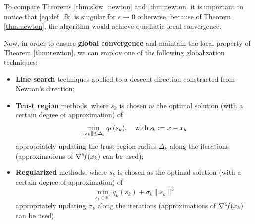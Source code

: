 \documentclass[10pt,a4paper]{article}
\begin{document}
\begin{remark}
	To compare Theorems \ref{thm:slow_newton} and \ref{thm:newton} it is important to notice that \eqref{eq:def_fk} is singular for $\epsilon\to 0$ otherwise, because of Theorem \ref{thm:newton}, the algorithm would achieve quadratic local convergence.
\end{remark}
\noindent Now, in order to ensure \textbf{global convergence} and maintain the local property of Theorem \ref{thm:newton}, we can employ one of the following globalization techniques:
\begin{itemize}
	\item \textbf{Line search} techniques applied to a descent direction constructed from Newton's direction;
	\item \textbf{Trust region} methods, where $s_k$ is chosen as the optimal solution (with a certain degree of approximation) of
	\begin{equation*}
		\min_{\|s_k\| \leq \Delta_k} q_k(s_k), \quad \mathord{\mathrm{with }}\, s_k:=x-x_k
	\end{equation*}
	appropriately updating the trust region radius $\Delta_k$ along the iterations (approximations of $\operatorname*{\mathit{\nabla^2 \!f}}(x_k)$ can be used);
	\item \textbf{Regularized} methods, where $s_k$ is chosen as the optimal solution (with a certain degree of approximation) of
	\begin{equation*}
		\min_{s_k \in \mathbb{R}^n} q_k(s_k) + \sigma_k \|s_k\|^3
	\end{equation*}
	appropriately updating $\sigma_k$ along the iterations (approximations of $\operatorname*{\mathit{\nabla^2 \!f}}(x_k)$ can be used).
\end{itemize}
\end{document}
